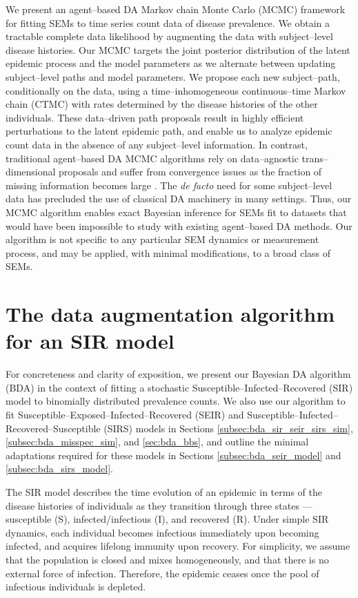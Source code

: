 We present an agent--based DA Markov chain Monte Carlo (MCMC) framework for fitting SEMs to time series count data of disease prevalence. We obtain a tractable complete data likelihood by augmenting the data with subject--level disease histories. Our MCMC targets the joint posterior distribution of the latent epidemic process and the model parameters as we alternate between updating subject--level paths and model parameters. We propose each new subject--path, conditionally on the data, using a time--inhomogeneous continuous--time Markov chain (CTMC) with rates determined by the disease histories of the other individuals. These data--driven path proposals result in highly efficient perturbations to the latent epidemic path, and enable us to analyze epidemic count data in the absence of any subject--level information. In contrast, traditional agent--based DA MCMC algorithms rely on data--agnostic trans--dimensional proposals and suffer from convergence issues as the fraction of missing information becomes large \cite{roberts2001, mckinley2014simulation, pooley2015}. The \textit{de facto} need for some subject--level data has precluded the use of classical DA machinery in many settings. Thus, our MCMC algorithm enables exact Bayesian inference for SEMs fit to datasets that would have been impossible to study with existing agent--based DA methods. Our algorithm is not specific to any particular SEM dynamics or measurement process, and may be applied, with minimal modifications, to a broad class of SEMs. 

\section{The data augmentation algorithm for an SIR model}
\label{sec:bda_sir_model}

For concreteness and clarity of exposition, we present our Bayesian DA algorithm (BDA) in the context of fitting a stochastic Susceptible--Infected--Recovered (SIR) model to binomially distributed prevalence counts. We also use our algorithm to fit Susceptible--Exposed--Infected--Recovered (SEIR) and Susceptible--Infected--Recovered--Susceptible (SIRS) models in Sections \ref{subsec:bda_sir_seir_sirs_sim}, \ref{subsec:bda_misspec_sim}, and \ref{sec:bda_bbs}, and outline the minimal adaptations required for these models in Sections \ref{subsec:bda_seir_model} and \ref{subsec:bda_sirs_model}.

The SIR model describes the time evolution of an epidemic in terms of the disease histories of individuals as they transition through three states --- susceptible (S), infected/infectious (I), and recovered (R). Under simple SIR dynamics, each individual becomes infectious immediately upon becoming infected, and acquires lifelong immunity upon recovery. For simplicity, we assume that the population is closed and mixes homogeneously, and that there is no external force of infection. Therefore, the epidemic ceases once the pool of infectious individuals is depleted.

